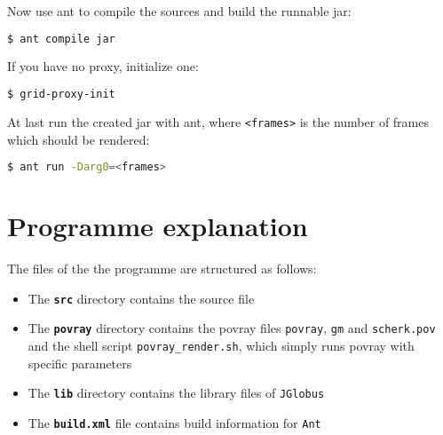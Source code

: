 \documentclass{article}
\begin{document}
Now use ant to compile the sources and build the runnable jar:

\begin{lstlisting}[language=bash]
  $ ant compile jar
\end{lstlisting}

If you have no proxy, initialize one:

\begin{lstlisting}[language=bash]
  $ grid-proxy-init
\end{lstlisting}

At last run the created jar with ant, where \texttt{<frames>} is the number of frames which should be rendered:

\begin{lstlisting}[language=bash]
  $ ant run -Darg0=<frames>
\end{lstlisting}




\section{Programme explanation}
The files of the the programme are structured as follows:

\begin{itemize}
\item The \texttt{\textbf{src}} directory contains the source file
\item The \texttt{\textbf{povray}} directory contains the povray files \texttt{povray}, \texttt{gm} and \texttt{scherk.pov} and the shell script \texttt{povray\_render.sh}, which simply runs povray with specific parameters
\item The \texttt{\textbf{lib}} directory contains the library files of \texttt{JGlobus}
\item The \texttt{\textbf{build.xml}} file contains build information for \texttt{Ant}
\end{itemize}
\end{document}
